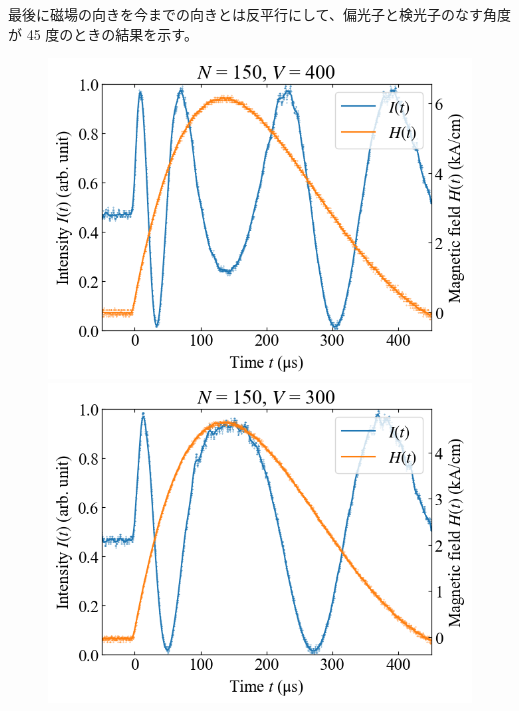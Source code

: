 \documentclass[9pt,dvipdfmx,a4paper]{jsarticle}
\begin{document}
最後に磁場の向きを今までの向きとは反平行にして、偏光子と検光子のなす角度が 45 度のときの結果を示す。
\begin{figure}[H]
    \centering
    \begin{minipage}[t]{0.24\columnwidth}
        \centering
        \includegraphics[width = \columnwidth]{xt/22.png}
    \end{minipage}
    \hfill
    \begin{minipage}[t]{0.24\columnwidth}
        \centering
        \includegraphics[width = \columnwidth]{xt/23.png}
    \end{minipage}
    \hfill
    \begin{minipage}[t]{0.24\columnwidth}
        \centering

\end{minipage}
\end{figure}
\end{document}
